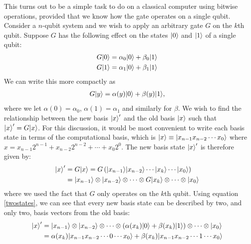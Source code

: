 \documentclass[bibliography=totocnumbered, 10pt]{article}
\theoremstyle{NoticeStyle}
\begin{document}
This turns out to be a simple task to do on a classical computer using bitwise operations, provided that we know how the gate operates on a single qubit. Consider a $n$-qubit system and we wish to apply an arbitrary gate $G$ on the $k$th qubit. Suppose $G$ has the following effect on the states ${\left\vert{0}\right\rangle}$ and ${\left\vert{1}\right\rangle}$ of a single qubit:
\begin{align}
	G{\left\vert{0}\right\rangle} &= \alpha_0 {\left\vert{0}\right\rangle} + \beta_0 {\left\vert{1}\right\rangle}\\
	G{\left\vert{1}\right\rangle} &= \alpha_1 {\left\vert{0}\right\rangle} + \beta_1 {\left\vert{1}\right\rangle}
\end{align} 
We can write this more compactly as
\begin{align}
 G{\left\vert{y}\right\rangle} = \alpha(y){\left\vert{0}\right\rangle} + \beta(y){\left\vert{1}\right\rangle}, \label{twostates}
\end{align}
 where we let $\alpha(0) = \alpha_0$, $\alpha(1) = \alpha_1$ and similarly for $\beta$.
We wish to find the relationship between the new basis ${\left\vert{x}\right\rangle}'$ and the old basis ${\left\vert{x}\right\rangle}$ such that ${\left\vert{x}\right\rangle}' = G{\left\vert{x}\right\rangle}$. For this discussion, it would be most convenient to write each basis state in terms of the computational basis, which is ${\left\vert{x}\right\rangle} \equiv {\left\vert{x_{n-1}x_{n-2}\dotsm x_0}\right\rangle}$ where $x = x_{n-1}2^{n-1} + x_{n-2}2^{n-2} + \dotsb + x_0 2^0$. The new basis state ${\left\vert{x}\right\rangle}'$ is therefore given by:
\begin{align}
	{\left\vert{x}\right\rangle}' &= G{\left\vert{x}\right\rangle} = G\left({\left\vert{x_{n-1}}\right\rangle} {\left\vert{x_{n-2}}\right\rangle} \dotsm {\left\vert{x_k}\right\rangle} \dotsm {\left\vert{x_0}\right\rangle}\right)\\
	&= {\left\vert{x_{n-1}}\right\rangle} \otimes {\left\vert{x_{n-2}}\right\rangle} \otimes \dotsm \otimes G{\left\vert{x_k}\right\rangle} \otimes \dotsm \otimes {\left\vert{x_0}\right\rangle}
\end{align}
where we used the fact that $G$ only operates on the $k$th qubit. Using equation \ref{twostates}, we can see that every new basis state can be described by two, and only two, basis vectors from the old basis:
\begin{align}
	{\left\vert{x}\right\rangle}' &= {\left\vert{x_{n-1}}\right\rangle} \otimes {\left\vert{x_{n-2}}\right\rangle} \otimes \dotsm \otimes \left(\alpha(x_k){\left\vert{0}\right\rangle} + \beta(x_k){\left\vert{1}\right\rangle} \right)  \otimes \dotsm \otimes {\left\vert{x_0}\right\rangle}\\
	&= \alpha(x_k){\left\vert{x_{n-1}x_{n-2}\dotsm 0 \dotsm x_0}\right\rangle} + \beta(x_k){\left\vert{x_{n-1}x_{n-2}\dotsm 1 \dotsm x_0}\right\rangle}
\end{align}
\end{document}
